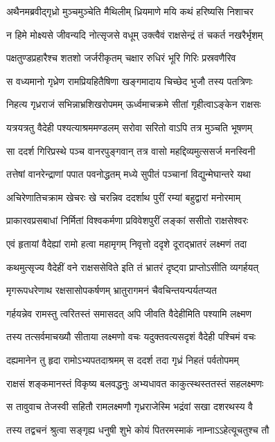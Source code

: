 \twolineshloka
{अथैनमब्रवीद्गृध्रो मुञ्चमुञ्चेति मैथिलीम्}
{ध्रियमाणे मयि कथं हरिष्यसि निशाचर}


\twolineshloka
{न हिमे मोक्ष्यसे जीवन्यदि नोत्सृजसे वधूम्}
{उक्त्वैवं राक्षसेन्द्रं तं चकर्त नखरैर्भृशम्}


\twolineshloka
{पक्षतुण्डप्रहारैश्च शतशो जर्जरीकृतम्}
{चक्षार रुधिरं भूरि गिरिः प्रस्रवणैरिव}


\twolineshloka
{स वध्यमानो गृध्रेण रामप्रियहितैषिणा}
{खङ्गमादाय चिच्छेद भुजौ तस्य पतत्रिणः}


\twolineshloka
{निहत्य गृध्रराजं सभिन्नाभ्रशिखरोपमम्}
{ऊर्ध्वमाचक्रमे सीतां गृहीत्वाऽङ्केन राक्षसः}


\twolineshloka
{यत्रयत्रतु वैदेही पश्यत्याश्रममण्डलम्}
{सरोवा सरितो वाऽपि तत्र मुञ्चति भूषणम्}


\twolineshloka
{सा ददर्श गिरिप्रस्थे पञ्च वानरपुङ्गवान्}
{तत्र वासो महद्दिव्यमुत्ससर्ज मनस्विनी}


\twolineshloka
{तत्तेषां वानरेन्द्राणां पपात पवनोद्धतम्}
{मध्ये सुपीतं पञ्चानां विद्युन्मेघान्तरे यथा}


\twolineshloka
{अचिरेणातिचक्राम खेचरः खे चरन्निव}
{ददर्शाथ पुरीं रम्यां बहुद्वारां मनोरमाम्}


\twolineshloka
{प्राकारवप्रसबाधां निर्मितां विश्वकर्मणा}
{प्रविवेशपुरीं लङ्कां ससीतो राक्षसेश्वरः}


\twolineshloka
{एवं हृतायां वैदेह्यां रामो हत्वा महामृगम्}
{निवृत्तो ददृशे दूराद्भ्रातरं लक्ष्मणं तदा}


\twolineshloka
{कथमुत्सृज्य वैदेहीं वने राक्षससेविते}
{इति तं भ्रातरं दृष्ट्वा प्राप्तोऽसीति व्यगर्हयत्}


\twolineshloka
{मृगरूपधरेणाथ रक्षसासोपकर्षणम्}
{भ्रातुरागमनं चैवचिन्तयन्पर्यतप्यत}


\twolineshloka
{गर्हयन्नेव रामस्तु त्वरितस्तं समासदत्}
{अपि जीवति वैदेहीमिति पश्यामि लक्ष्मण}


\twolineshloka
{तस्य तत्सर्वमाचख्यौ सीताया लक्ष्मणो वचः}
{यदुक्तवत्यसदृशं वैदेही पश्चिमं वचः}


\twolineshloka
{दह्यमानेन तु हृदा रामोऽभ्यपतदाश्रमम्}
{स ददर्श तदा गृध्रं निहतं पर्वतोपमम्}


\twolineshloka
{राक्षसं शङ्कमानस्तं विकृष्य बलवद्धनुः}
{अभ्यधावत काकुत्स्थस्ततस्तं सहलक्ष्मणः}


\twolineshloka
{स तावुवाच तेजस्वी सहितौ रामलक्ष्मणौ}
{गृध्रराजेस्मि भद्रंवां सखा दशरथस्य वै}


\twolineshloka
{तस्य तद्वचनं श्रुत्वा सङ्गृह्य धनुषी शुभे}
{कोयं पितरमस्माकं नाम्नाऽऽहेत्यूचतुश्च तौ}


